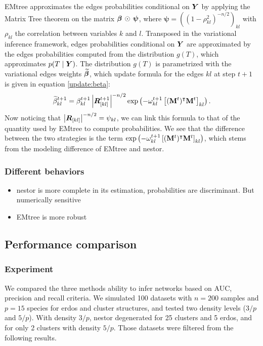 \begin{subappendices}
EMtree approximates the edges probabilities conditional on  ${\boldsymbol{Y}}$ by applying the Matrix Tree theorem on the matrix ${\boldsymbol{\beta}} \,\odot \,\boldsymbol{\psi}$, where $\boldsymbol{\psi}=\left((1-\rho_{kl}^2)^{-n/2}\right)_{kl}$ with $\rho_{kl}$ the correlation between variables $k$ and $l$. Transposed in the variational inference framework, edges probabilities conditional on ${\boldsymbol{Y}}$ are approximated by the edges probabilities computed from the distribution $g(T)$, which approximates $p(T\mid{\boldsymbol{Y}})$. The distribution $g(T)$ is parametrized with the  variational edges weights ${\widetilde{{\boldsymbol{\beta}}}}$, which update formula for the edges $kl$ at step $t+1$ is given in equation \eqref{update:beta}: $$ {\widetilde{\beta}}^{t+1}_{kl} = \beta^{t+1}_{kl} \left|{\boldsymbol{R}}_{[kl]}^{t+1}\right|^{-n/2} \exp\left(-\omega^{t+1}_{kl} \left[({\bf M}^t)^\intercal {\bf M}^t\right]_{kl}\right).$$
Now noticing that $ \left|{\boldsymbol{R}}_{[kl]}\right|^{-n/2} =\psi_{kl}$,  we can link this formula to that of the quantity used by EMtree to compute probabilities. We see that the difference between the two strategies is the term $\exp\left(-\omega^{t+1}_{kl} \left[({\bf M}^t)^\intercal {\bf M}^t\right]_{kl}\right)$, which stems from the modeling difference of EMtree and nestor.

\subsubsection*{Different behaviors}
\begin{itemize}
\item nestor is more complete in its estimation, probabilities are discriminant. But numerically sensitive
\item EMtree is more robust
\end{itemize}

\tocless\subsection{Performance comparison}
\subsubsection*{Experiment}
We compared the three methods ability to infer networks based on AUC,  precision and recall criteria. We simulated 100 datasets with $n=200$ samples  and $p=15$ species for erdos and cluster structures, and tested two density levels ($3/p$ and $5/p$). With density $3/p$, nestor degenerated for 25 clusters and 5 erdos, and for only 2 clusters with density $5/p$.  Those datasets were filtered from the following results.


\end{subappendices}

